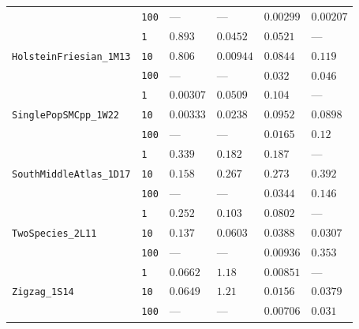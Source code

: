 \documentclass{article}
\begin{document}
\begin{footnotesize}
\begin{tabular}{llllll}
 & \texttt{100} & --- & --- & $0.00299$ & $0.00207$ \\
\cline{1-6}
\multirow[c]{3}{*}{\texttt{HolsteinFriesian\_1M13}} & \texttt{1} & $0.893$ & $0.0452$ & $0.0521$ & --- \\
 & \texttt{10} & $0.806$ & $0.00944$ & $0.0844$ & $0.119$ \\
 & \texttt{100} & --- & --- & $0.032$ & $0.046$ \\
\cline{1-6}
\multirow[c]{3}{*}{\texttt{SinglePopSMCpp\_1W22}} & \texttt{1} & $0.00307$ & $0.0509$ & $0.104$ & --- \\
 & \texttt{10} & $0.00333$ & $0.0238$ & $0.0952$ & $0.0898$ \\
 & \texttt{100} & --- & --- & $0.0165$ & $0.12$ \\
\cline{1-6}
\multirow[c]{3}{*}{\texttt{SouthMiddleAtlas\_1D17}} & \texttt{1} & $0.339$ & $0.182$ & $0.187$ & --- \\
 & \texttt{10} & $0.158$ & $0.267$ & $0.273$ & $0.392$ \\
 & \texttt{100} & --- & --- & $0.0344$ & $0.146$ \\
\cline{1-6}
\multirow[c]{3}{*}{\texttt{TwoSpecies\_2L11}} & \texttt{1} & $0.252$ & $0.103$ & $0.0802$ & --- \\
 & \texttt{10} & $0.137$ & $0.0603$ & $0.0388$ & $0.0307$ \\
 & \texttt{100} & --- & --- & $0.00936$ & $0.353$ \\
\cline{1-6}
\multirow[c]{3}{*}{\texttt{Zigzag\_1S14}} & \texttt{1} & $0.0662$ & $1.18$ & $0.00851$ & --- \\
 & \texttt{10} & $0.0649$ & $1.21$ & $0.0156$ & $0.0379$ \\
 & \texttt{100} & --- & --- & $0.00706$ & $0.031$ \\
\cline{1-6}
\bottomrule
\end{tabular}
\end{footnotesize}
\end{document}
